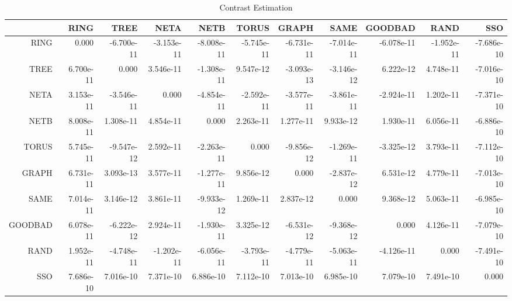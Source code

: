 \documentclass[a4paper,10pt]{article}
\begin{document}
\begin{landscape}
\begin{table}[!htp]
\centering\tiny
\caption{Contrast Estimation}
\begin{tabular}{
|r|r|r|r|r|r|r|r|r|r|r|}
\hline
 & RING& TREE& NETA& NETB& TORUS& GRAPH& SAME& GOODBAD& RAND& SSO\\
\hline
 RING&0.000&-6.700e-11&-3.153e-11&-8.008e-11&-5.745e-11&-6.731e-11&-7.014e-11&-6.078e-11&-1.952e-11&-7.686e-10\\
\hline
 TREE&6.700e-11&0.000&3.546e-11&-1.308e-11&9.547e-12&-3.093e-13&-3.146e-12&6.222e-12&4.748e-11&-7.016e-10\\
\hline
 NETA&3.153e-11&-3.546e-11&0.000&-4.854e-11&-2.592e-11&-3.577e-11&-3.861e-11&-2.924e-11&1.202e-11&-7.371e-10\\
\hline
 NETB&8.008e-11&1.308e-11&4.854e-11&0.000&2.263e-11&1.277e-11&9.933e-12&1.930e-11&6.056e-11&-6.886e-10\\
\hline
 TORUS&5.745e-11&-9.547e-12&2.592e-11&-2.263e-11&0.000&-9.856e-12&-1.269e-11&-3.325e-12&3.793e-11&-7.112e-10\\
\hline
 GRAPH&6.731e-11&3.093e-13&3.577e-11&-1.277e-11&9.856e-12&0.000&-2.837e-12&6.531e-12&4.779e-11&-7.013e-10\\
\hline
 SAME&7.014e-11&3.146e-12&3.861e-11&-9.933e-12&1.269e-11&2.837e-12&0.000&9.368e-12&5.063e-11&-6.985e-10\\
\hline
 GOODBAD&6.078e-11&-6.222e-12&2.924e-11&-1.930e-11&3.325e-12&-6.531e-12&-9.368e-12&0.000&4.126e-11&-7.079e-10\\
\hline
 RAND&1.952e-11&-4.748e-11&-1.202e-11&-6.056e-11&-3.793e-11&-4.779e-11&-5.063e-11&-4.126e-11&0.000&-7.491e-10\\
\hline
 SSO&7.686e-10&7.016e-10&7.371e-10&6.886e-10&7.112e-10&7.013e-10&6.985e-10&7.079e-10&7.491e-10&0.000\\
\hline

\end{tabular}
\end{table}

\newpage


\end{landscape}
\end{document}
